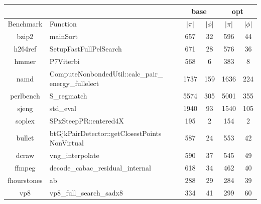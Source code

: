 \begin{table}[!t]
\begin{center}
\begin{small}
\begin{tabularx}{0.9\textwidth}{|c|X|c|c|c|c|}
\cline{3-6}
\multicolumn{2}{l|}{} & \multicolumn{2}{c|}{base} & \multicolumn{2}{c|}{opt} \\
\hline
Benchmark & Function & $|\pi|$ & $|\phi|$ & $|\pi|$ & $|\phi|$ \\
\hline
\hline
bzip2 & mainSort & 657 & 32 & 596 & 44 \\ 
\hline
h264ref & SetupFastFullPelSearch & 671 & 28 & 576 & 36 \\ 
\hline
hmmer & P7Viterbi & 568 & 6 & 383 & 8 \\
\hline
namd & ComputeNonbondedUtil::calc\_pair\_ energy\_fullelect & 1737 & 159 & 1636 & 224 \\
\hline
perlbench & S\_regmatch & 5574 & 305 & 5001 & 355 \\
\hline
sjeng & std\_eval & 1940 & 93 & 1540 & 105 \\
\hline
soplex & SPxSteepPR::entered4X & 195 & 2 & 154 & 2 \\
\hline
bullet & btGjkPairDetector::getClosestPoints NonVirtual & 587 & 24 & 553 & 42 \\
\hline
dcraw & vng\_interpolate & 590 & 37 & 545 & 49 \\
\hline
ffmpeg & decode\_cabac\_residual\_internal & 618 & 34 & 462 & 40 \\
\hline
fhourstones & ab & 288 & 29 & 284 & 39 \\
\hline
vp8 & vp8\_full\_search\_sadx8 & 334 & 41 & 299 & 60 \\
\hline
\end{tabularx}

\vspace{6mm}


\end{small}
\end{center}
\end{table}
